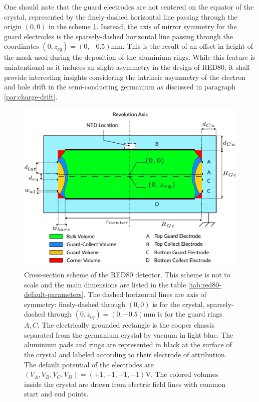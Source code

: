 One should note that the guard electrodes are not centered on the equator of the crystal, represented by the finely-dashed horizontal line passing through the origin $(0,0)$ in the scheme \ref{fig:red80-scheme}. Instead, the axis of mirror symmetry for the guard electrodes is the sparsely-dashed  horizontal line passing through the coordinates $(0, z_{eq})=(0, -0.5)\si{\mm}$. This is the result of an offset in height of the mask used during the deposition of the aluminium rings. While this feature is unintentional as it induces an slight asymmetry in the design of RED80, it shall provide interesting insights considering the intrinsic asymmetry of the electron and hole drift in the semi-conducting germanium as discussed in paragraph \ref{par:charge-drift}.

\begin{figure}
\centering
\includegraphics[scale=1]{Figures/ElectrodesExperimental/scheme_red80.pdf}
\caption{Cross-section scheme of the RED80 detector. This scheme is not to scale and the main dimensions are listed in the table \ref{tab:red80-default-parameters}. The dashed horizontal lines are axis of symmetry: finely-dashed through $(0,0)$ is for the crystal, sparsely-dashed through $(0, z_{eq})=(0, -0.5)\si{\mm}$  is for the guard rings $A,C$. The electrically grounded rectangle is the cooper chassis separated from the germanium crystal by vacuum in light blue. The aluminium pads and rings are represented in black at the surface of the crystal and labeled according to their electrode of attribution. The default potential of the electrodes are $(V_A, V_B, V_C, V_D) = (+1, +1, -1, -1) \si{\volt}$. The colored volumes inside the crystal are drawn from electric field lines with common start and end points.}
\label{fig:red80-scheme}
\end{figure}


